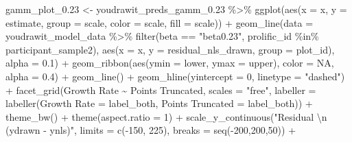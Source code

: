 \documentclass[print]{nuthesis}
\newenvironment{Shaded}{\begin{snugshade}}{\end{snugshade}}
\newcommand{\AttributeTok}[1]{\textcolor[rgb]{0.77,0.63,0.00}{#1}}
\newcommand{\ConstantTok}[1]{\textcolor[rgb]{0.00,0.00,0.00}{#1}}
\newcommand{\DecValTok}[1]{\textcolor[rgb]{0.00,0.00,0.81}{#1}}
\newcommand{\FloatTok}[1]{\textcolor[rgb]{0.00,0.00,0.81}{#1}}
\newcommand{\FunctionTok}[1]{\textcolor[rgb]{0.00,0.00,0.00}{#1}}
\newcommand{\NormalTok}[1]{#1}
\newcommand{\OtherTok}[1]{\textcolor[rgb]{0.56,0.35,0.01}{#1}}
\newcommand{\SpecialCharTok}[1]{\textcolor[rgb]{0.00,0.00,0.00}{#1}}
\newcommand{\StringTok}[1]{\textcolor[rgb]{0.31,0.60,0.02}{#1}}
\begin{document}
\begin{Shaded}
\begin{Highlighting}[]
\NormalTok{gamm\_plot\_0}\FloatTok{.23} \OtherTok{\textless{}{-}}\NormalTok{ youdrawit\_preds\_gamm\_0}\FloatTok{.23} \SpecialCharTok{\%\textgreater{}\%}
  \FunctionTok{ggplot}\NormalTok{(}\FunctionTok{aes}\NormalTok{(}\AttributeTok{x =}\NormalTok{ x, }\AttributeTok{y =}\NormalTok{ estimate, }\AttributeTok{group =}\NormalTok{ scale, }\AttributeTok{color =}\NormalTok{ scale, }\AttributeTok{fill =}\NormalTok{ scale)) }\SpecialCharTok{+}
  \FunctionTok{geom\_line}\NormalTok{(}\AttributeTok{data =}\NormalTok{ youdrawit\_model\_data }\SpecialCharTok{\%\textgreater{}\%} 
              \FunctionTok{filter}\NormalTok{(beta }\SpecialCharTok{==} \StringTok{"beta0.23"}\NormalTok{, prolific\_id }\SpecialCharTok{\%in\%}\NormalTok{ participant\_sample2), }
            \FunctionTok{aes}\NormalTok{(}\AttributeTok{x =}\NormalTok{ x, }\AttributeTok{y =}\NormalTok{ residual\_nls\_drawn, }\AttributeTok{group =}\NormalTok{ plot\_id), }\AttributeTok{alpha =} \FloatTok{0.1}\NormalTok{) }\SpecialCharTok{+}
  \FunctionTok{geom\_ribbon}\NormalTok{(}\FunctionTok{aes}\NormalTok{(}\AttributeTok{ymin =}\NormalTok{ lower, }\AttributeTok{ymax =}\NormalTok{ upper), }\AttributeTok{color =} \ConstantTok{NA}\NormalTok{, }\AttributeTok{alpha =} \FloatTok{0.4}\NormalTok{) }\SpecialCharTok{+}
  \FunctionTok{geom\_line}\NormalTok{() }\SpecialCharTok{+}
  \FunctionTok{geom\_hline}\NormalTok{(}\AttributeTok{yintercept =} \DecValTok{0}\NormalTok{, }\AttributeTok{linetype =} \StringTok{"dashed"}\NormalTok{) }\SpecialCharTok{+}
  \FunctionTok{facet\_grid}\NormalTok{(}\StringTok{\textasciigrave{}}\AttributeTok{Growth Rate}\StringTok{\textasciigrave{}} \SpecialCharTok{\textasciitilde{}} \StringTok{\textasciigrave{}}\AttributeTok{Points Truncated}\StringTok{\textasciigrave{}}\NormalTok{, }\AttributeTok{scales =} \StringTok{"free"}\NormalTok{, }\AttributeTok{labeller =} \FunctionTok{labeller}\NormalTok{(}\StringTok{\textasciigrave{}}\AttributeTok{Growth Rate}\StringTok{\textasciigrave{}} \OtherTok{=}\NormalTok{ label\_both, }\StringTok{\textasciigrave{}}\AttributeTok{Points Truncated}\StringTok{\textasciigrave{}} \OtherTok{=}\NormalTok{ label\_both)) }\SpecialCharTok{+}
  \FunctionTok{theme\_bw}\NormalTok{() }\SpecialCharTok{+}
  \FunctionTok{theme}\NormalTok{(}\AttributeTok{aspect.ratio =} \DecValTok{1}\NormalTok{) }\SpecialCharTok{+}
  \FunctionTok{scale\_y\_continuous}\NormalTok{(}\StringTok{"Residual }\SpecialCharTok{\textbackslash{}n}\StringTok{ (ydrawn {-} ynls)"}\NormalTok{, }\AttributeTok{limits =} \FunctionTok{c}\NormalTok{(}\SpecialCharTok{{-}}\DecValTok{150}\NormalTok{, }\DecValTok{225}\NormalTok{), }\AttributeTok{breaks =} \FunctionTok{seq}\NormalTok{(}\SpecialCharTok{{-}}\DecValTok{200}\NormalTok{,}\DecValTok{200}\NormalTok{,}\DecValTok{50}\NormalTok{)) }\SpecialCharTok{+}

\end{Highlighting}
\end{Shaded}
\end{document}
